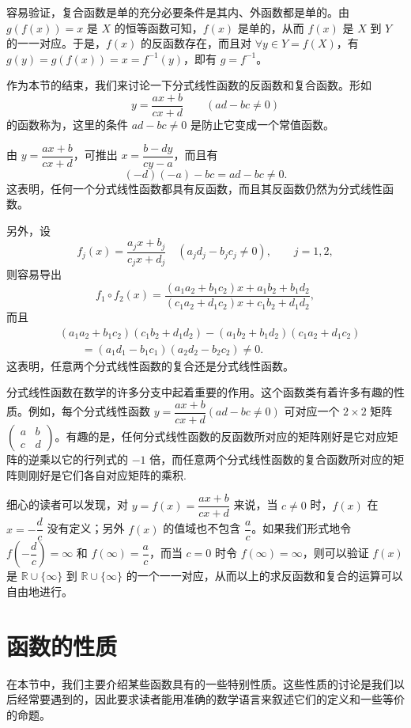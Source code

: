 \documentclass[UTF8,12pt,a4paper,fontset=fandol]{ctexbook}
\begin{document}
\noindent{}\quad 容易验证，复合函数是单的充分必要条件是其内、外函数都是单的。由 $g(f(x))=x$ 是 $X$ 的恒等函数可知，$f(x)$ 是单的，从而 $f(x)$ 是 $X$ 到 $Y$ 的一一对应。于是，$f(x)$ 的反函数存在，而且对 $\forall y\in Y=f(X)$，有 $g(y)=g(f(x))=x=f^{-1}(y)$，即有 $g=f^{-1}$。

作为本节的结束，我们来讨论一下分式线性函数的反函数和复合函数。形如
\[
  y=\frac{ax+b}{cx+d}\qquad (ad-bc\ne0)
\]
的函数称为，这里的条件 $ad-bc\ne0$ 是防止它变成一个常值函数。

由 $y=\dfrac{ax+b}{cx+d}$，可推出 $x=\dfrac{b-dy}{cy-a}$，而且有
\[
  (-d)(-a)-bc=ad-bc\ne0.
\]
这表明，任何一个分式线性函数都具有反函数，而且其反函数仍然为分式线性函数。

另外，设
\[
  f_j(x)=\frac{a_jx+b_j}{c_jx+d_j}\quad (a_jd_j-b_jc_j\ne0),\qquad j=1,2,
\]
则容易导出
\[
  f_1\circ f_2(x)=
  \frac{(a_1a_2+b_1c_2)x+a_1b_2+b_1d_2}
  {(c_1a_2+d_1c_2)x+c_1b_2+d_1d_2},
\]
而且
\[
\begin{aligned}
 &(a_1a_2+b_1c_2)(c_1b_2+d_1d_2)
 -(a_1b_2+b_1d_2)(c_1a_2+d_1c_2)\\
 &\qquad=(a_1d_1-b_1c_1)(a_2d_2-b_2c_2)\ne0.
\end{aligned}
\]
这表明，任意两个分式线性函数的复合还是分式线性函数。

分式线性函数在数学的许多分支中起着重要的作用。这个函数类有着许多有趣的性质。例如，每个分式线性函数 $y=\dfrac{ax+b}{cx+d}(ad-bc\ne0)$ 可对应一个 $2\times2$ 矩阵 $\begin{pmatrix}a&b\\ c&d\end{pmatrix}$。有趣的是，任何分式线性函数的反函数所对应的矩阵刚好是它对应矩阵的逆乘以它的行列式的 $-1$ 倍，而任意两个分式线性函数的复合函数所对应的矩阵则刚好是它们各自对应矩阵的乘积.

细心的读者可以发现，对 $y=f(x)=\dfrac{ax+b}{cx+d}$ 来说，当 $c\ne0$ 时，$f(x)$ 在 $x=-\dfrac dc$ 没有定义；另外 $f(x)$ 的值域也不包含 $\dfrac ac$。如果我们形式地令 $f(-\dfrac dc)=\infty$ 和 $f(\infty)=\dfrac ac$，而当 $c=0$ 时令 $f(\infty)=\infty$，则可以验证 $f(x)$ 是 $\mathbb{R}\cup\{\infty\}$ 到 $\mathbb{R}\cup\{\infty\}$ 的一个一一对应，从而以上的求反函数和复合的运算可以自由地进行。

\section{函数的性质}

在本节中，我们主要介绍某些函数具有的一些特别性质。这些性质的讨论是我们以后经常要遇到的，因此要求读者能用准确的数学语言来叙述它们的定义和一些等价的命题。
\end{document}
